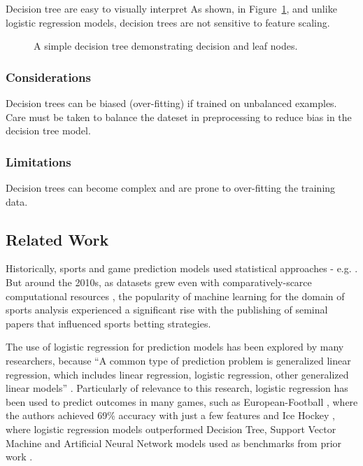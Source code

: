 \documentclass[12pt]{article}
\begin{document}
Decision tree are easy to visually interpret As shown, in Figure~\ref{fig:decision-tree}, and unlike logistic regression models, decision trees are not sensitive to feature scaling.

\begin{figure}[ht]
\centering
{}
\caption{A simple decision tree demonstrating decision and leaf nodes.}
\label{fig:decision-tree}
\end{figure}

\subsubsection{Considerations}Decision trees can be biased (over-fitting) if trained on unbalanced examples. Care must be taken to balance the dateset in preprocessing to reduce bias in the decision tree model.

\subsubsection{Limitations}Decision trees can become complex and are prone to over-fitting the training data.

\subsection{Related Work}
Historically, sports and game prediction models used statistical approaches - e.g. \cite{Clarke1995} \cite{Bailey2006}. But around the 2010s, as datasets grew even with comparatively-scarce computational resources \cite{Bottou2003}, the popularity of machine learning for the domain of sports analysis experienced a significant rise \cite{aiSports} with the publishing of seminal papers \cite{Constantinou2012} that influenced sports betting strategies.

The use of logistic regression for prediction models has been explored by many researchers, because ``A common type of prediction problem is generalized linear regression, which includes linear regression, logistic regression, other generalized linear models'' \cite{Gordon1999}. Particularly of relevance to this research, logistic regression has been used to predict outcomes in many games, such as European-Football \cite{Prasetio2016}, where the authors achieved 69\% accuracy with just a few features and Ice Hockey \cite{Chin2023}, where logistic regression models outperformed Decision Tree, Support Vector Machine and Artificial Neural Network models used as benchmarks from prior work \cite{Pischedda2014} \cite{Igiri2014}.
\end{document}
